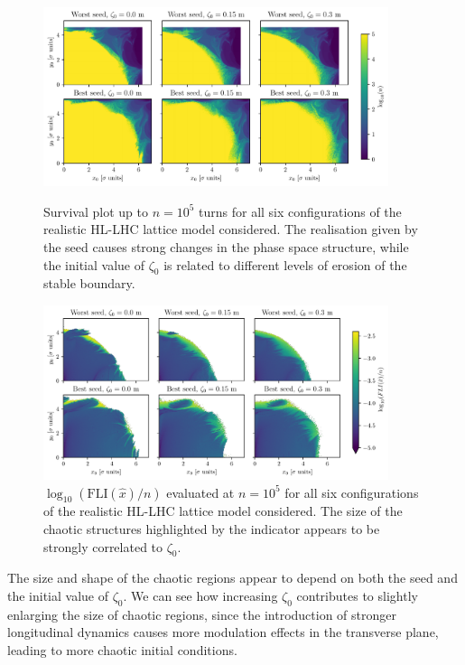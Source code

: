\begin{figure}
    \centering
    \includegraphics[width=0.9\textwidth]{6_lhc_dynamic_indicators/figs/stability.pdf}
    \caption{Survival plot up to $n=10^5$ turns for all six configurations of the realistic HL-LHC lattice model considered. The realisation given by the seed causes strong changes in the phase space structure, while the initial value of $\zeta_0$ is related to different levels of erosion of the stable boundary.}
    \label{fig:true_survivors}
    \vspace{\floatsep}
    \includegraphics[width=0.9\textwidth]{6_lhc_dynamic_indicators/figs/fli_all.pdf}
    \caption{$\log_{10}(\mathrm{FLI}(\hat{x})/n)$ evaluated at $n=10^5$ for all six configurations of the realistic HL-LHC lattice model considered. The size of the chaotic structures highlighted by the indicator appears to be strongly correlated to $\zeta_0$.}
    \label{fig:fli_all}
\end{figure}

The size and shape of the chaotic regions appear to depend on both the seed and the initial value of $\zeta_0$. We can see how increasing $\zeta_0$ contributes to slightly enlarging the size of chaotic regions, since the introduction of stronger longitudinal dynamics causes more modulation effects in the transverse plane, leading to more chaotic initial conditions. 

